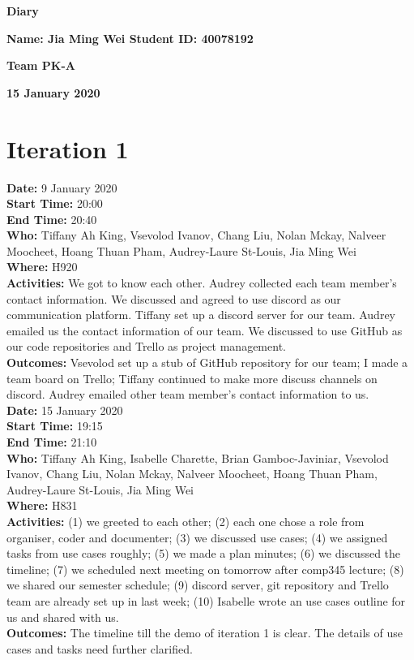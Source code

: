 \documentclass[12pt]{article}
\begin{document}
\vspace*{0.2in}
\centerline{\bf\Large Diary}

\vspace*{0.2in}
\centerline{\bf\Large Name: Jia Ming Wei   Student ID: 40078192}

\vspace*{0.2in}
\centerline{\bf\Large Team PK-A}

\vspace*{0.2in}
\centerline{\bf\Large 15 January 2020}

\section{Iteration 1}

{\bf Date:} 9 January 2020\\
{\bf Start Time:} 20:00\\
{\bf End Time:}  20:40\\
{\bf Who:} Tiffany Ah King,
Vsevolod Ivanov,
Chang Liu,
Nolan Mckay,
Nalveer Moocheet,
Hoang Thuan Pham,
Audrey-Laure St-Louis,
Jia Ming Wei\\
{\bf Where:} H920 \\
{\bf Activities:} We got to know each other. Audrey collected each team member's contact information. We discussed and agreed to use discord as our communication platform. Tiffany set up a discord server for our team. Audrey emailed us the contact information of our team. We discussed to use GitHub as our code repositories and Trello as project management.\\
{\bf Outcomes:}  Vsevolod set up a stub of GitHub repository for our team; I made a team board on Trello; Tiffany continued to make more discuss channels on discord. Audrey emailed other team member's contact information to us. \\

{\bf Date:} 15 January 2020\\
{\bf Start Time:} 19:15\\
{\bf End Time:}  21:10\\
{\bf Who:} Tiffany Ah King,
Isabelle Charette,
Brian Gamboc-Javiniar,
Vsevolod Ivanov,
Chang Liu,
Nolan Mckay,
Nalveer Moocheet,
Hoang Thuan Pham,
Audrey-Laure St-Louis,
Jia Ming Wei\\
{\bf Where:} H831 \\
{\bf Activities:} (1) we greeted to each other; (2) each one chose a role from organiser, coder and documenter; (3) we discussed use cases; (4) we assigned tasks from use cases roughly; (5) we made a plan minutes; (6) we discussed the timeline; (7) we scheduled next meeting on tomorrow after comp345 lecture; (8) we shared our semester schedule; (9) discord server, git repository and Trello team are already set up in last week; (10) Isabelle wrote an use cases outline for us and shared with us.  \\
{\bf Outcomes:} The timeline till the demo of iteration 1 is clear. The details of use cases and tasks need further clarified.\\
\end{document}
